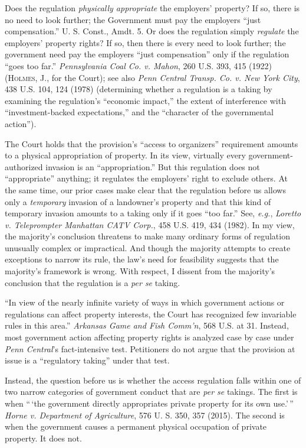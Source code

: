 Does the regulation \textit{physically appropriate} the employers' property? If
so, there is no need to look further; the Government must pay the employers
``just compensation.'' U. S. Const., Amdt. 5. Or does the regulation simply
\textit{regulate} the employers' property rights? If so, then there is every
need to look further; the government need pay the employers ``just
compensation'' only if the regulation ``goes too far.'' \textit{Pennsylvania
Coal Co. v. Mahon}, 260 U.S. 393, 415 (1922) (\textsc{Holmes}, J., for the
Court); see also \textit{Penn Central Transp. Co. v. New York City}, 438 U.S.
104, 124 (1978) (determining whether a regulation is a taking by examining the
regulation's ``economic impact,'' the extent of interference with
``investment-backed expectations,'' and the ``character of the governmental
action'').


The Court holds that the provision's ``access to organizers'' requirement
amounts to a physical appropriation of property. In its view, virtually every
government-authorized invasion is an ``appropriation.'' But this regulation does
not ``appropriate'' anything; it regulates the employers' right to exclude
others. At the same time, our prior cases make clear that the regulation before
us allows only a \textit{temporary} invasion of a landowner's property and that
this kind of temporary invasion amounts to a taking only if it goes ``too far.''
See, \textit{e.g.}, \textit{Loretto v. Teleprompter Manhattan CATV Corp.}, 458
U.S. 419, 434 (1982). In my view, the majority's conclusion threatens to make
many ordinary forms of regulation unusually complex or impractical. And though
the majority attempts to create exceptions to narrow its rule, the law's need
for feasibility suggests that the majority's framework is wrong. With respect, I
dissent from the majority's conclusion that the regulation is a \textit{per se}
taking.



``In view of the nearly infinite variety of ways in which government actions or
regulations can affect property interests, the Court has recognized few
invariable rules in this area.'' \textit{Arkansas Game and Fish Comm'n}, 568
U.S. at 31. Instead, most government action affecting property rights is
analyzed case by case under \textit{Penn Central}'s fact-intensive test.
Petitioners do not argue that the provision at issue is a ``regulatory taking''
under that test.


Instead, the question before us is whether the access regulation falls within
one of two narrow categories of government conduct that are \textit{per se}
takings. The first is when ``\,`the government directly appropriates private
property for its own use.'\,'' \textit{Horne v. Department of
Agriculture}, 576 U. S. 350, 357 (2015). The second is when the government
causes a permanent physical occupation of private property. It does not.


